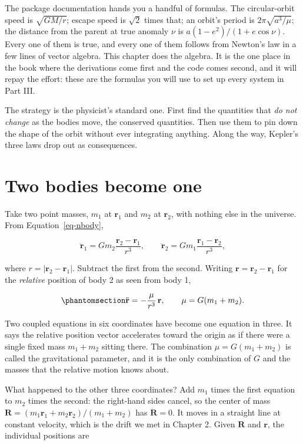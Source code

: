 \documentclass[
  10.5pt,
  letterpaper,
]{scrbook}
\theoremstyle{plain}
\theoremstyle{remark}
\begin{document}
The package documentation hands you a handful of formulas. The
circular-orbit speed is \(\sqrt{GM/r}\); escape speed is \(\sqrt{2}\)
times that; an orbit's period is \(2\pi\sqrt{a^3/\mu}\); the distance
from the parent at true anomaly \(\nu\) is \(a(1-e^2)/(1+e\cos\nu)\).
Every one of them is true, and every one of them follows from Newton's
law in a few lines of vector algebra. This chapter does the algebra. It
is the one place in the book where the derivations come first and the
code comes second, and it will repay the effort: these are the formulas
you will use to set up every system in Part III.

The strategy is the physicist's standard one. First find the quantities
that \emph{do not change} as the bodies move, the conserved quantities.
Then use them to pin down the shape of the orbit without ever
integrating anything. Along the way, Kepler's three laws drop out as
consequences.

\section{Two bodies become one}\label{two-bodies-become-one}

Take two point masses, \(m_1\) at \(\mathbf{r}_1\) and \(m_2\) at
\(\mathbf{r}_2\), with nothing else in the universe. From
Equation~\ref{eq-nbody},

\[
\ddot{\mathbf{r}}_1 = G m_2 \frac{\mathbf{r}_2 - \mathbf{r}_1}{r^3}, \qquad
\ddot{\mathbf{r}}_2 = G m_1 \frac{\mathbf{r}_1 - \mathbf{r}_2}{r^3},
\]

where \(r = |\mathbf{r}_2 - \mathbf{r}_1|\). Subtract the first from the
second. Writing \(\mathbf{r} = \mathbf{r}_2 - \mathbf{r}_1\) for the
\emph{relative} position of body 2 as seen from body 1,

\begin{equation}\protect\phantomsection\label{eq-relative}{
\ddot{\mathbf{r}} = -\frac{\mu}{r^3}\,\mathbf{r}, \qquad \mu = G(m_1 + m_2).
}\end{equation}

Two coupled equations in six coordinates have become one equation in
three. It says the relative position vector accelerates toward the
origin as if there were a single fixed mass \(m_1 + m_2\) sitting there.
The combination \(\mu = G(m_1+m_2)\) is called the gravitational
parameter, and it is the only combination of \(G\) and the masses that
the relative motion knows about.

What happened to the other three coordinates? Add \(m_1\) times the
first equation to \(m_2\) times the second: the right-hand sides cancel,
so the center of mass
\(\mathbf{R} = (m_1\mathbf{r}_1 + m_2\mathbf{r}_2)/(m_1+m_2)\) has
\(\ddot{\mathbf{R}} = 0\). It moves in a straight line at constant
velocity, which is the drift we met in Chapter 2. Given \(\mathbf{R}\)
and \(\mathbf{r}\), the individual positions are
\end{document}
